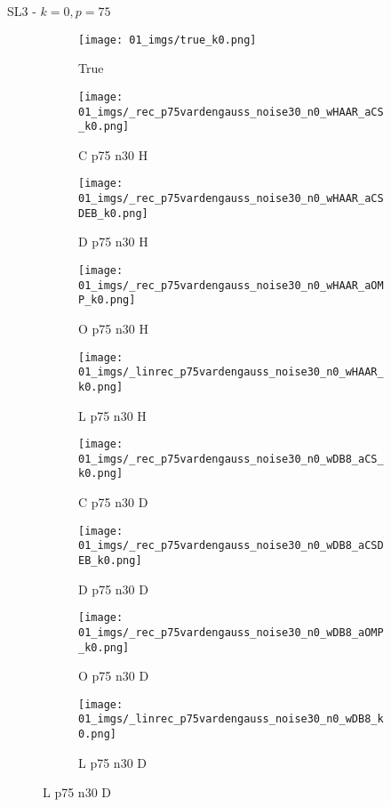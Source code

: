 \begin{frame}{SL3 - $k=0,p=75$}{}
\begin{figure}
\begin{subfigure}{0.1\textwidth}
\texttt{[image: 01\_imgs/true\_k0.png]}
\caption*{\Tiny True}
\end{subfigure}
\begin{subfigure}{0.1\textwidth}
\texttt{[image: 01\_imgs/\_rec\_p75vardengauss\_noise30\_n0\_wHAAR\_aCS\_k0.png]}
\caption*{\Tiny C p75 n30 H}
\end{subfigure}
\begin{subfigure}{0.1\textwidth}
\texttt{[image: 01\_imgs/\_rec\_p75vardengauss\_noise30\_n0\_wHAAR\_aCSDEB\_k0.png]}
\caption*{\Tiny D p75 n30 H}
\end{subfigure}
\begin{subfigure}{0.1\textwidth}
\texttt{[image: 01\_imgs/\_rec\_p75vardengauss\_noise30\_n0\_wHAAR\_aOMP\_k0.png]}
\caption*{\Tiny O p75 n30 H}
\end{subfigure}
\begin{subfigure}{0.1\textwidth}
\texttt{[image: 01\_imgs/\_linrec\_p75vardengauss\_noise30\_n0\_wHAAR\_k0.png]}
\caption*{\Tiny L p75 n30 H}
\end{subfigure}
\begin{subfigure}{0.1\textwidth}
\texttt{[image: 01\_imgs/\_rec\_p75vardengauss\_noise30\_n0\_wDB8\_aCS\_k0.png]}
\caption*{\Tiny C p75 n30 D}
\end{subfigure}
\begin{subfigure}{0.1\textwidth}
\texttt{[image: 01\_imgs/\_rec\_p75vardengauss\_noise30\_n0\_wDB8\_aCSDEB\_k0.png]}
\caption*{\Tiny D p75 n30 D}
\end{subfigure}
\begin{subfigure}{0.1\textwidth}
\texttt{[image: 01\_imgs/\_rec\_p75vardengauss\_noise30\_n0\_wDB8\_aOMP\_k0.png]}
\caption*{\Tiny O p75 n30 D}
\end{subfigure}
\begin{subfigure}{0.1\textwidth}
\texttt{[image: 01\_imgs/\_linrec\_p75vardengauss\_noise30\_n0\_wDB8\_k0.png]}
\caption*{\Tiny L p75 n30 D}
\end{subfigure}
\end{figure}
\end{frame}


